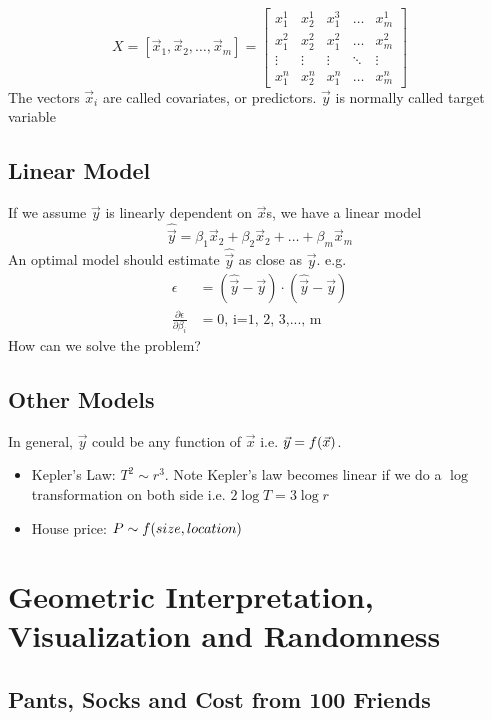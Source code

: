 \documentclass[12pt, oneside]{article}
\begin{document}
\[X=
[\vec{x}_1,\vec{x}_2, \hdots, \vec{x}_m]=
\begin{bmatrix}
    x_1^1 & x_2^1  & x_1^3  & \dots  & x_m^1 \\
    x_1^2 & x_2^2  & x_1^2  & \dots  & x_m^2\\
    \vdots& \vdots & \vdots & \ddots & \vdots \\
  	x_1^n & x_2^n  & x_1^n  & \dots  & x_m^n
\end{bmatrix}
\]
The vectors $\vec{x}_i$ are called covariates, or predictors. 
$\vec{y}$ is normally called  target variable 

\subsection{Linear Model}
If we assume $\vec{y}$ is linearly dependent on $\vec{x}$s, we have a linear model
$${\hat{\vec{y}}}=\beta_1\vec{x}_2+\beta_2\vec{x}_2+ \dots +\beta_m\vec{x}_m$$
An optimal model should estimate $\hat{\vec{y}}$ as close as $\vec{y}$. e.g.
\begin{align*}
\epsilon&=(\hat{\vec{y}}-\vec{y})\cdot(\hat{\vec{y}}-\vec{y})\\
\frac{\partial{\epsilon}}{\partial \beta_i}&=0 \text{, i=1, 2, 3,..., m}
\end{align*}
How can we solve the problem?


\subsection{Other Models}
In general, $\vec{y}$ could be any function of $\vec{x}$ i.e. $\vec{y}=\mathnormal{f}({\vec{x}})$.

\begin{itemize}
\item Kepler's Law: $T^2 \sim r^3$. Note Kepler's law becomes linear if we do a $\log$ transformation on both side i.e. $2\log T=3\log r$
\item House price: $P \sim \mathnormal{f}(size, location)$
\end{itemize}

\section{Geometric Interpretation, Visualization and Randomness}
\subsection{Pants, Socks and Cost from 100 Friends}
\end{document}
